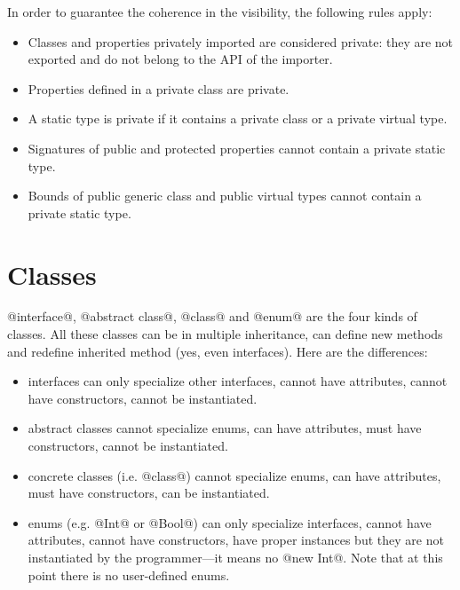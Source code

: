 In order to guarantee the coherence in the visibility, the following rules apply:
\begin{itemize}
\item Classes and properties privately imported are considered private: they are not exported and do not belong to the API of the importer.
\item Properties defined in a private class are private.
\item A static type is private if it contains a private class or a private virtual type.
\item Signatures of public and protected properties cannot contain a private static type.
\item Bounds of public generic class and public virtual types cannot contain a private static type.
\end{itemize}


\section{Classes}\label{class}

@interface@, @abstract class@, @class@ and @enum@ are the four kinds of classes. All these classes can be in multiple inheritance, can define new methods and redefine inherited method (yes, even interfaces). Here are the differences:
\begin{itemize}
\item interfaces can only specialize other interfaces, cannot have attributes, cannot have constructors, cannot be instantiated.
\item abstract classes cannot specialize enums, can have attributes, must have constructors, cannot be instantiated.
\item concrete classes (i.e. @class@) cannot specialize enums, can have attributes, must have constructors, can be instantiated.
\item enums (e.g. @Int@ or @Bool@) can only specialize interfaces, cannot have attributes, cannot have constructors, have proper instances but they are not instantiated by the programmer---it means no @new Int@. Note that at this point there is no user-defined enums.
\end{itemize}

